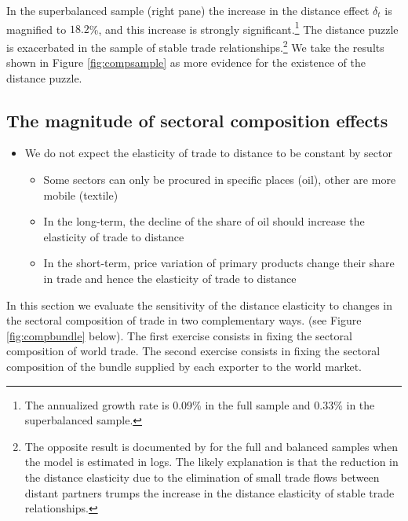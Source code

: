 \documentclass[12pt,twoside,a4paper,notitlepage]{article}
\begin{document}
In the superbalanced sample (right pane) the increase in the distance effect $\delta_t$ is magnified to $18.2$\%, and this increase is strongly significant.\footnote{The annualized growth rate is 0.09\% in the full sample and 0.33\% in the superbalanced sample.}
The distance puzzle is exacerbated in the sample of stable trade relationships.\footnote{The opposite result is documented by \cite{Head2013} for the full and balanced samples when the model is estimated in logs. The likely explanation is that the reduction 
in the distance elasticity due to the elimination of small trade flows between distant partners trumps the increase in the distance elasticity of stable trade relationships.}
We take the results shown in Figure \ref{fig:compsample} as more evidence for the existence of the distance puzzle. 

\subsection{The magnitude of sectoral composition effects} \label{subsec:robustpuzzle}

\begin{itemize}
	\item We do not expect the elasticity of trade to distance to be constant by sector
	\begin{itemize}
		\item Some sectors can only be procured in specific places (oil), other are more mobile (textile)
		\item In the long-term, the decline of the share of oil should increase the elasticity of trade to distance
		\item In the short-term, price variation of primary products change their share in trade and hence the elasticity of trade to distance
	\end{itemize}
\end{itemize}


In this section we evaluate the sensitivity of the distance elasticity to changes in the sectoral composition of trade in two complementary ways. 
 (see Figure \ref{fig:compbundle} below).\fi
The first exercise consists in fixing the sectoral composition of world trade.
The second exercise consists in fixing the sectoral composition of the bundle supplied by each exporter to the world market.
\end{document}
